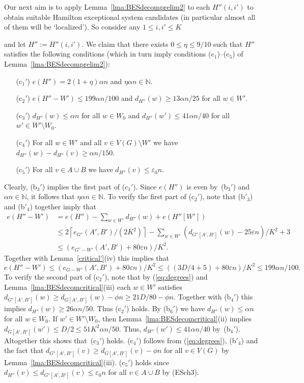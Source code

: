 \documentclass{memo-l}
\def\COMMENT#1{}
\def\eps{\varepsilon}
\def\epszero{\eps_0}
\numberwithin{section}{chapter}
\numberwithin{equation}{section}
\numberwithin{firstthm}{section}
\numberwithin{figure}{section}
\begin{document}
{Our next aim is to apply Lemma~\ref{lma:BESdecomprelim2} to each $H''(i,i')$ to obtain suitable Hamilton exceptional system candidates
(in particular almost all of them will be `localized').
So consider any $ 1 \le i,i' \le K$%
\COMMENT{AL: added $1 \le$}
 and let $H'':=H''(i,i')$. We claim that there exists $0 \le \eta \le  9/10$
such that $H''$ satisfies the following conditions (which in turn imply conditions (c$_1$)--(c$_5$) of Lemma~\ref{lma:BESdecomprelim2}): 
\begin{itemize}
	\item[\rm (c$_1'$)] $e(H'') = 2(1+ \eta)\alpha n$ and $\eta \alpha n\in \mathbb{N}$.
	\item[\rm (c$_2'$)] $e(H''- W' ) \le 199 \alpha n/100$ and $d_{H''}(w) \ge 13 \alpha n / 25 $ for all $w \in W'$.
	\item[\rm (c$_3'$)] $d_{H''}(w) \le \alpha n$ for all $w \in W_0$ and $d_{H''}(w') \le 41 \alpha n /40$ for all $w'\in W'\setminus W_0$.%
	\COMMENT{Recall that if $W_0\neq W'$ then $W_0=\{w_,w_2\}$ and $W'=\{w_,w_2,w_3\}$.}
	\item[\rm (c$_4'$)] For all $w \in W'$ and all $v \in V(G) \setminus W'$ we have $d_{H''}(w) - d_{H''}(v) \ge \alpha n/150$.
	\item[\rm (c$_5'$)] For all $v \in A \cup B$ we have $d_{H''}(v) \le \epszero n$.
\end{itemize}
Clearly, (b$_3'$) implies the first part of (c$_1'$). Since $e(H'')$ is even by~(b$_3'$) and $\alpha n\in \mathbb{N}$,
it follows that $\eta \alpha n\in \mathbb{N}$.
To verify the first part of (c$_2'$), note that (b$'_3$) and (b$'_4$) together imply that
\begin{align*}
e(H''- W' ) & = e(H'')-\sum_{w\in W'} d_{H''}(w)+e(H''[W']) \\ & \le 
2 \left\lceil e_{G^{\diamond}}(A',B') / (2 K^2) \right\rceil- \sum_{w\in W'} (d_{G^\diamond[A',B']}(w) - 25 \eps n)/K^2 +3\\
& \le (e_{G^\diamond-W'}(A',B') +80\eps n)/K^2.
\end{align*}
Together with Lemma~\ref{critical'}(iv) this implies that
$$e(H''- W' )\le (e_{G-W'}(A',B') +80\eps n)/K^2\le ((3D/4+5)+80\eps n)/K^2\le 199 \alpha n/100.$$
To verify the second part of (c$_2'$), note that by (\ref{eq:degrees}) and Lemma~\ref{lma:BESdecomcritical}(iii) each $w\in W'$
satisfies $d_{G^\diamond [A',B']}(w)\ge d_{G[A',B']}(w)-\phi n \ge 21D/80-\phi n$. Together with (b$_4'$)
this implies $d_{H''}(w) \ge 26\alpha n/50$. Thus (c$_2'$) holds. By (b$_6'$) we have $d_{H''}(w) \le \alpha n $ for all $w \in W_0$.
If $w' \in W' \setminus W_0$, then Lemma~\ref{lma:BESdecomcritical}(ii) implies $d_{G[A',B']}(w') \le D/2 \le 51 K^2 \alpha n /50$.
Thus, $d_{H''}(w') \le 41 \alpha n /40$ by~(b$_4'$). Altogether this shows that~(c$_3'$) holds.
(c$_4'$) follows from (\ref{eq:degrees}), (b$'_4$) and the fact that $d_{G^\diamond [A',B']}(v)\ge d_{G[A',B']}(v)-\phi n$ for all
$v\in V(G)$ by Lemma~\ref{lma:BESdecomcritical}(iii).
(c$_5'$) holds since $d_{H''}(v) \le d_{G^\diamond[A',B']}(v) \le \eps_0 n$ for all $v\in A\cup B$ by (ESch3).

}
\end{document}
